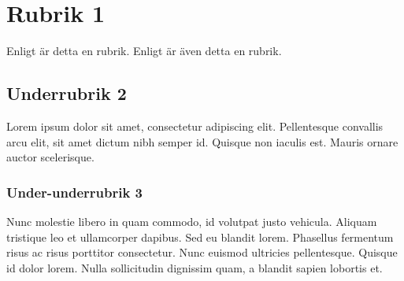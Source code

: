 \documentclass[paper=a4, fontsize=11pt]{article} %
\begin{document}
\section{Rubrik 1}
Enligt \cite{small} är detta en rubrik. Enligt \cite{big} är även detta en rubrik.
\subsection{Underrubrik 2}
Lorem ipsum dolor sit amet, consectetur adipiscing elit. Pellentesque convallis arcu elit, sit amet dictum nibh semper id. Quisque non iaculis est. Mauris ornare auctor scelerisque.
\subsubsection{Under-underrubrik 3}
Nunc molestie libero in quam commodo, id volutpat justo vehicula. Aliquam tristique leo et ullamcorper dapibus. Sed eu blandit lorem. Phasellus fermentum risus ac risus porttitor consectetur. Nunc euismod ultricies pellentesque. Quisque id dolor lorem. Nulla sollicitudin dignissim quam, a blandit sapien lobortis et.
\end{document}
